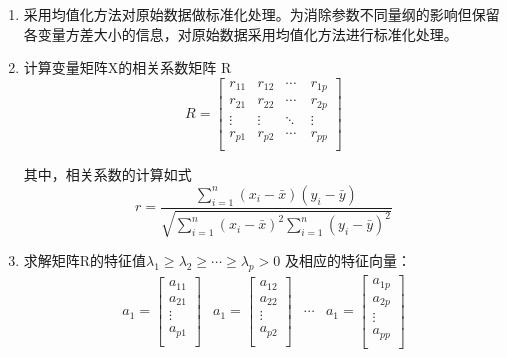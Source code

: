 \documentclass[bwprint]{gmcmthesis}
\begin{document}
\begin{enumerate}
\item 采用均值化方法对原始数据做标准化处理。为消除参数不同量纲的影响但保留各变量方差大小的信息，对原始数据采用均值化方法进行标准化处理。
\item 计算变量矩阵X的相关系数矩阵 R
\begin{equation}
R=\begin{bmatrix}
r_{11}  &  r_{12}  & \cdots\ &r_{1p}\\
r_{21}  &  r_{22}  & \cdots\ & r_{2p}\\
 \vdots   & \vdots & \ddots  & \vdots  \\
 r_{p1} & r_{p2}  & \cdots\ & r_{pp}\\
\end{bmatrix}
\end{equation}

其中，相关系数的计算如式 
\begin{equation}
r=\frac{\sum\limits^n_{i=1}(x_i-\bar x)(y_i-\bar y)}{\sqrt{\sum\limits^n_{i=1}(x_i-\bar x)^2\sum\limits^n_{i=1}(y_i-\bar y)^2}}
\end{equation}

\item 求解矩阵R的特征值$\lambda_1\geq \lambda_2\geq \cdots \geq \lambda_p > 0$ 及相应的特征向量：
\begin{equation}
\begin{matrix}
a_{1}=\begin{bmatrix}
a_{11}\\
a_{21}\\
 \vdots \\
 a_{p1}\\
\end{bmatrix}&
a_{1}=\begin{bmatrix}
a_{12}\\
a_{22}\\
 \vdots \\
 a_{p2}\\
\end{bmatrix}&\cdots&
a_{1}=\begin{bmatrix}
a_{1p}\\
a_{2p}\\
 \vdots \\
 a_{pp}\\
\end{bmatrix}

\end{matrix}
\end{equation}


\end{enumerate}
\end{document}
